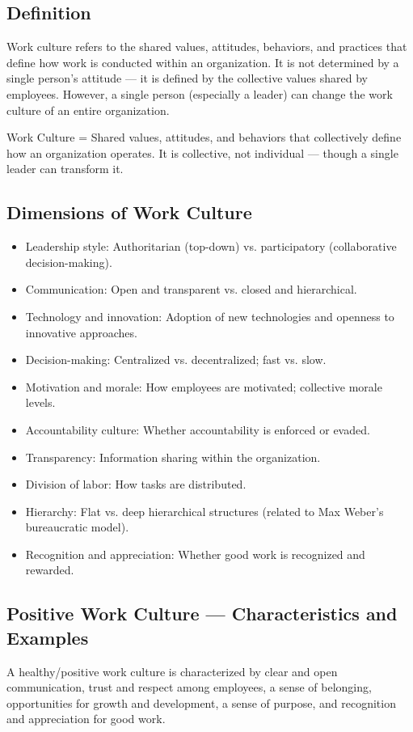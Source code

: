 \subsection{Definition}
Work culture refers to the shared values, attitudes, behaviors, and practices that define how work is conducted within an organization. It is not determined by a single person's attitude --- it is defined by the collective values shared by employees. However, a single person (especially a leader) can change the work culture of an entire organization.

\begin{KeyConcept}
Work Culture = Shared values, attitudes, and behaviors that collectively define how an organization operates. It is collective, not individual --- though a single leader can transform it.
\end{KeyConcept}

\subsection{Dimensions of Work Culture}
\begin{itemize}
\item Leadership style: Authoritarian (top-down) vs. participatory (collaborative decision-making).
\item Communication: Open and transparent vs. closed and hierarchical.
\item Technology and innovation: Adoption of new technologies and openness to innovative approaches.
\item Decision-making: Centralized vs. decentralized; fast vs. slow.
\item Motivation and morale: How employees are motivated; collective morale levels.
\item Accountability culture: Whether accountability is enforced or evaded.
\item Transparency: Information sharing within the organization.
\item Division of labor: How tasks are distributed.
\item Hierarchy: Flat vs. deep hierarchical structures (related to Max Weber's bureaucratic model).
\item Recognition and appreciation: Whether good work is recognized and rewarded.
\end{itemize}

\subsection{Positive Work Culture --- Characteristics and Examples}
A healthy/positive work culture is characterized by clear and open communication, trust and respect among employees, a sense of belonging, opportunities for growth and development, a sense of purpose, and recognition and appreciation for good work.

